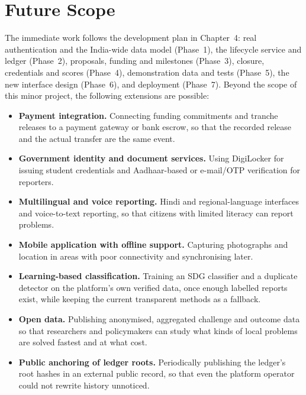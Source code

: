 \section{Future Scope}
The immediate work follows the development plan in Chapter~4: real authentication and the India-wide data model (Phase~1), the lifecycle service and ledger (Phase~2), proposals, funding and milestones (Phase~3), closure, credentials and scores (Phase~4), demonstration data and tests (Phase~5), the new interface design (Phase~6), and deployment (Phase~7). Beyond the scope of this minor project, the following extensions are possible:
\begin{itemize}
  \item \textbf{Payment integration.} Connecting funding commitments and tranche releases to a payment gateway or bank escrow, so that the recorded release and the actual transfer are the same event.
  \item \textbf{Government identity and document services.} Using DigiLocker for issuing student credentials and Aadhaar-based or e-mail/OTP verification for reporters.
  \item \textbf{Multilingual and voice reporting.} Hindi and regional-language interfaces and voice-to-text reporting, so that citizens with limited literacy can report problems.
  \item \textbf{Mobile application with offline support.} Capturing photographs and location in areas with poor connectivity and synchronising later.
  \item \textbf{Learning-based classification.} Training an SDG classifier and a duplicate detector on the platform's own verified data, once enough labelled reports exist, while keeping the current transparent methods as a fallback.
  \item \textbf{Open data.} Publishing anonymised, aggregated challenge and outcome data so that researchers and policymakers can study what kinds of local problems are solved fastest and at what cost.
  \item \textbf{Public anchoring of ledger roots.} Periodically publishing the ledger's root hashes in an external public record, so that even the platform operator could not rewrite history unnoticed.
\end{itemize}
